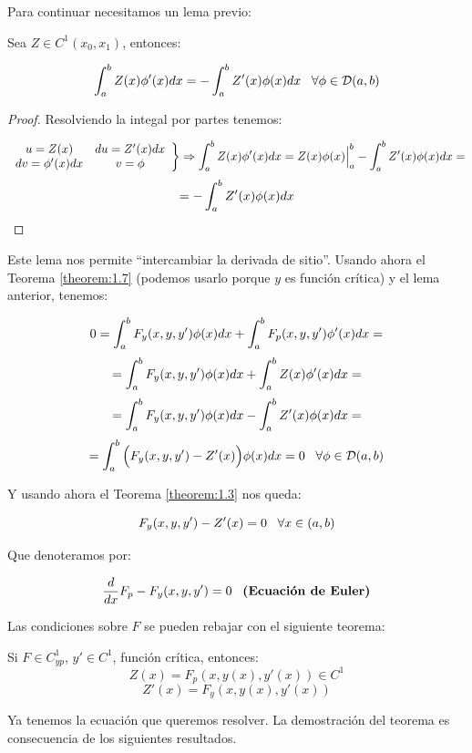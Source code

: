 Para continuar necesitamos un lema previo:

\begin{lemma}
Sea $Z\in C^1(x_0,x_1)$, entonces:

\[
\displaystyle\int_{ a }^{ b } Z(x)\phi'(x)dx=-\displaystyle\int_{ a }^{ b } Z'(x)\phi(x)dx \;\;\; \forall \phi\in\mathcal{D}(a,b)
\]
\end{lemma}

\begin{proof}

Resolviendo la integal por partes tenemos:

\[
\left.\begin{array}{cc}
u=Z(x) & du=Z'(x)dx\\
dv=\phi'(x)dx & v=\phi
\end{array}\right\} \Rightarrow\displaystyle\int_{ a }^{ b } Z(x)\phi'(x)dx=Z(x)\phi(x)\Big|_a^b-\displaystyle\int_{ a }^{ b } Z'(x)\phi(x)dx=
\]
\[
=-\displaystyle\int_{ a }^{ b } Z'(x)\phi(x)dx
\]

\end{proof}

Este lema nos permite \enquote{intercambiar la derivada de sitio}.
Usando ahora el Teorema \ref{theorem:1.7} (podemos usarlo porque $y$ es función crítica) y el lema anterior, tenemos:

\[
0=\displaystyle\int_{ a }^{ b } F_y(x,y, y')\phi(x)dx+\displaystyle\int_{ a }^{ b } F_p(x,y,y')\phi'(x)dx= 
\]
\[
=\displaystyle\int_{ a }^{ b } F_y(x,y, y')\phi(x)dx+\displaystyle\int_{ a }^{ b } Z(x)\phi'(x)dx=
\]
\[
=\displaystyle\int_{ a }^{ b } F_y(x,y, y')\phi(x)dx-\displaystyle\int_{ a }^{ b } Z'(x)\phi(x)dx=
\]
\[
=\displaystyle\int_{ a }^{ b } \Big(F_y(x,y, y')-Z'(x)\Big)\phi(x)dx=0 \;\;\; \forall\phi\in\mathcal{D}(a,b)
\]

Y usando ahora el Teorema \ref{theorem:1.3} nos queda:

\[
F_y(x,y,y')-Z'(x)=0 \;\;\; \forall x \in(a,b)
\]

Que denoteramos por:

\[
\frac{d}{dx}F_p-F_y(x,y,y')=0 \;\;\; \textbf{(Ecuación de Euler)}
\]

Las condiciones sobre $F$ se pueden rebajar con el siguiente teorema:

\begin{theorem} 
\label{theorem:12}
Si $F\in C^1_{yp}$, $y'\in C^1$, función crítica, entonces:
\[
Z(x)=F_p(x,y(x),y'(x))\in C^1
\]
\[
Z'(x)=F_y(x,y(x),y'(x))
\]

\end{theorem}

Ya tenemos la ecuación que queremos resolver. La demostración del teorema es consecuencia de los siguientes resultados.

